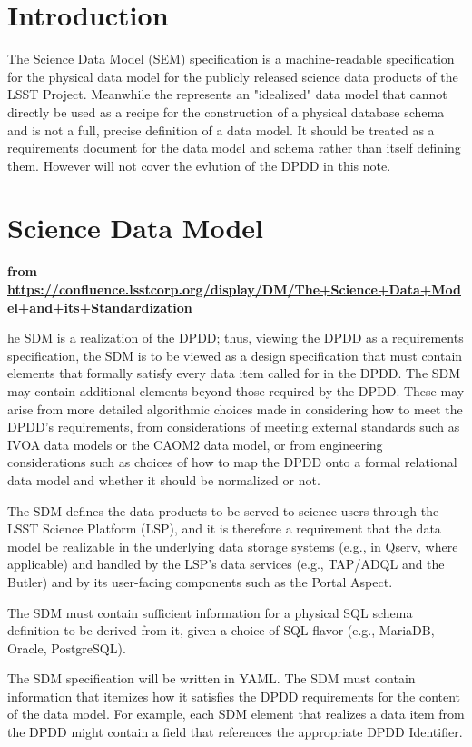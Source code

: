 
\section{Introduction}

The Science Data Model (SEM) specification is a machine-readable specification for the physical data model for the publicly released science data products of the LSST Project.
Meanwhile the \DPDD  represents an "idealized" data model that cannot directly be used as a recipe for the construction of a physical database schema and is not a full, precise definition of a data model.
It should be treated as a requirements document for the data model and schema rather than itself defining them. However will not cover the evlution of the DPDD in this note.


\section {Science Data Model}
{\bf from  \url{https://confluence.lsstcorp.org/display/DM/The+Science+Data+Model+and+its+Standardization}}

he SDM is a realization of the DPDD; thus, viewing the DPDD as a requirements specification, the SDM is to be viewed as a design specification that must contain elements that formally satisfy every data item called for in the DPDD.  The SDM may contain additional elements beyond those required by the DPDD.  These may arise from more detailed algorithmic choices made in considering how to meet the DPDD's requirements, from considerations of meeting external standards such as IVOA data models or the CAOM2 data model, or from engineering considerations such as choices of how to map the DPDD onto a formal relational data model and whether it should be normalized or not.

The SDM defines the data products to be served to science users through the LSST Science Platform (LSP), and it is therefore a requirement that the data model be realizable in the underlying data storage systems (e.g., in Qserv, where applicable) and handled by the LSP's data services (e.g., TAP/ADQL and the Butler) and by its user-facing components such as the Portal Aspect.

The SDM must contain sufficient information for a physical SQL schema definition to be derived from it, given a choice of SQL flavor (e.g., MariaDB, Oracle, PostgreSQL).

The SDM specification will be written in YAML.  The SDM must contain information that itemizes how it satisfies the DPDD requirements for the content of the data model.  For example, each SDM element that realizes a data item from the DPDD might contain a field that references the appropriate DPDD Identifier.

